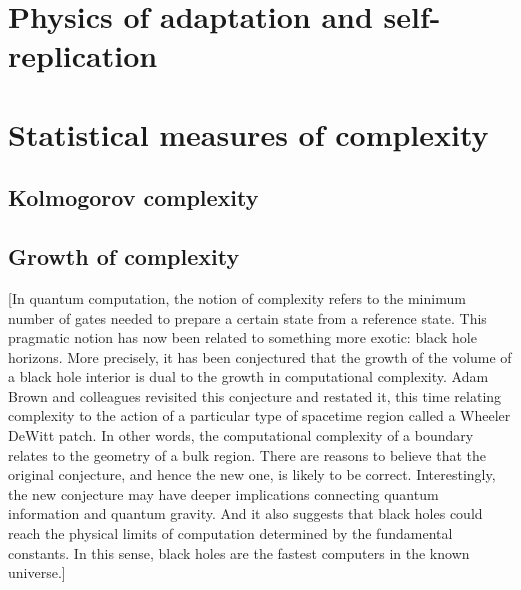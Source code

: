 \documentclass[a4paper,12pt,nofootinbib]{article}
\begin{document}
\section{Physics of adaptation and self-replication}

\section{Statistical measures of complexity}
\subsection{Kolmogorov complexity}

\subsection{Growth of complexity}


[In quantum computation, the notion of complexity refers to the minimum number of gates needed to prepare a certain state from a reference state. This pragmatic notion has now been related to something more exotic: black hole horizons. More precisely, it has been conjectured that the growth of the volume of a black hole interior is dual to the growth in computational complexity. Adam Brown and colleagues revisited this conjecture and restated it, this time relating complexity to the action of a particular type of spacetime region called a Wheeler DeWitt patch. In other words, the computational complexity of a boundary relates to the geometry of a bulk region.
There are reasons to believe that the original conjecture, and hence the new one, is likely to be correct. Interestingly, the new conjecture may have deeper implications connecting quantum information and quantum gravity. And it also suggests that black holes could reach the physical limits of computation determined by the fundamental constants. In this sense, black holes are the fastest computers in the known universe.]



\end{document}
